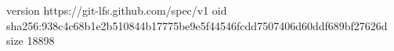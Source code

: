 version https://git-lfs.github.com/spec/v1
oid sha256:938c4c68b1e2b510844b17775be9e5f44546fcdd7507406d60ddf689bf27626d
size 18898
